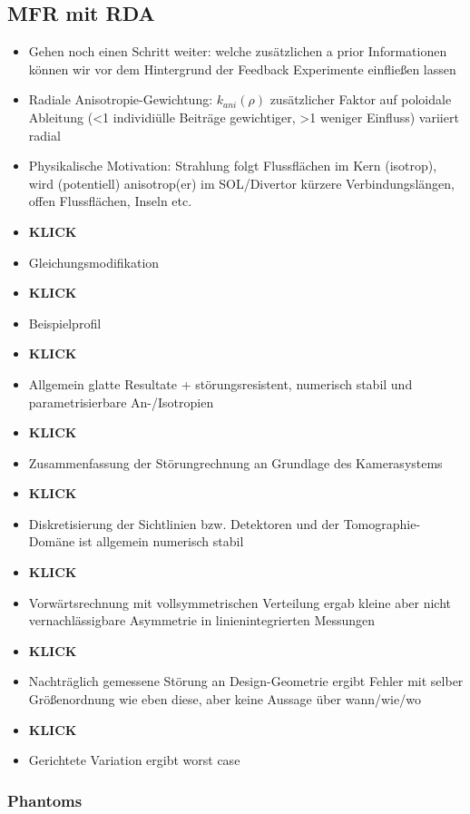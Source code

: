 \documentclass[11pt,a4paper]{article}
\begin{document}
\subsection{MFR mit RDA}

\begin{itemize}
\item Gehen noch einen Schritt weiter: welche zusätzlichen a prior Informationen können wir vor dem Hintergrund der Feedback Experimente einfließen lassen
\item Radiale Anisotropie-Gewichtung: $k_{ani}(\rho)$ zusätzlicher Faktor auf poloidale Ableitung (<1 individiülle Beiträge gewichtiger, >1 weniger Einfluss) variiert radial
\item Physikalische Motivation: Strahlung folgt Flussflächen im Kern (isotrop), wird (potentiell) anisotrop(er) im SOL/Divertor kürzere Verbindungslängen, offen Flussflächen, Inseln etc.
\item \textbf{KLICK}
\item Gleichungsmodifikation
\item \textbf{KLICK}
\item Beispielprofil
\item \textbf{KLICK}
\item Allgemein glatte Resultate + störungsresistent, numerisch stabil und parametrisierbare An-/Isotropien

\item \textbf{KLICK}
\item Zusammenfassung der Störungrechnung an Grundlage des Kamerasystems
\item \textbf{KLICK}
\item Diskretisierung der Sichtlinien bzw. Detektoren und der Tomographie-Domäne ist allgemein numerisch stabil
\item \textbf{KLICK}
\item Vorwärtsrechnung mit vollsymmetrischen Verteilung ergab kleine aber nicht vernachlässigbare Asymmetrie in linienintegrierten Messungen
\item \textbf{KLICK}
\item Nachträglich gemessene Störung an Design-Geometrie ergibt Fehler mit selber Größenordnung wie eben diese, aber keine Aussage über wann/wie/wo
\item \textbf{KLICK}
\item Gerichtete Variation ergibt worst case
\end{itemize}

\subsubsection*{Phantoms}
\end{document}
